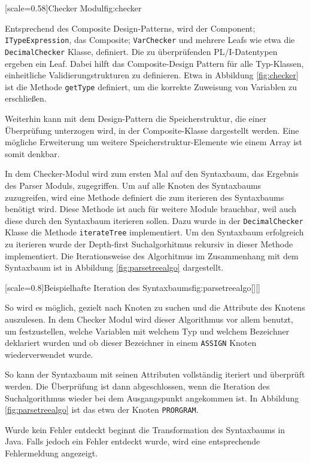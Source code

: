 [scale=0.58]{Checker Modul}{fig:checker}
\pagebreak

Entsprechend des Composite Design-Patterns, wird der Component; \verb+ITypeExpression+, das Composite; \verb+VarChecker+ und mehrere Leafs wie etwa die \verb+DecimalChecker+ Klasse, definiert.
Die zu überprüfenden PL/I-Datentypen ergeben ein Leaf.
Dabei hilft das Composite-Design Pattern für alle Typ-Klassen, einheitliche Validierungstrukturen zu definieren.
Etwa in Abbildung \ref{fig:checker} ist die Methode \verb+getType+ definiert, um die korrekte Zuweisung von Variablen zu erschließen. 

Weiterhin kann mit dem Design-Pattern die Speicherstruktur, die einer Überprüfung unterzogen wird, in der Composite-Klasse dargestellt werden.
Eine mögliche Erweiterung um weitere Speicherstruktur-Elemente wie einem Array ist somit denkbar.

In dem Checker-Modul wird zum ersten Mal auf den Syntaxbaum, das Ergebnis des Parser Moduls, zugegriffen.
Um auf alle Knoten des Syntaxbaums zuzugreifen, wird eine Methode definiert die zum iterieren des Syntaxbaums benötigt wird.
Diese Methode ist auch für weitere Module brauchbar, weil auch diese durch den Syntaxbaum iterieren sollen.
Dazu wurde in der \verb+DecimalChecker+ Klasse die Methode \verb+iterateTree+ implementiert.
Um den Syntaxbaum erfolgreich zu iterieren wurde der Depth-first Suchalgorhitmus rekursiv in dieser Methode implementiert.
Die Iterationsweise des Algorhitmus im Zusammenhang mit dem Syntaxbaum ist in Abbildung \ref{fig:parsetreealgo} dargestellt.

[scale=0.8]{Beispielhafte Iteration des Syntaxbaums}{fig:parsetreealgo}[][]
\pagebreak

So wird es möglich, gezielt nach Knoten zu suchen und die Attribute des Knotens auszulesen.
In dem Checker Modul wird dieser Algorithmus vor allem benutzt, um festzustellen, welche Variablen mit welchem Typ und welchem Bezeichner deklariert wurden und ob dieser Bezeichner in einem \verb+ASSIGN+ Knoten wiederverwendet wurde.

So kann der Syntaxbaum mit seinen Attributen vollständig iteriert und überprüft werden.
Die Überprüfung ist dann abgeschlossen, wenn die Iteration des Suchalgorithmus wieder bei dem Ausgangspunkt angekommen ist. In Abbildung \ref{fig:parsetreealgo} ist das etwa der Knoten \verb+PRORGRAM+.

Wurde kein Fehler entdeckt beginnt die Transformation des Syntaxbaums in Java. Falls jedoch ein Fehler entdeckt wurde, wird eine entsprechende Fehlermeldung angezeigt.

